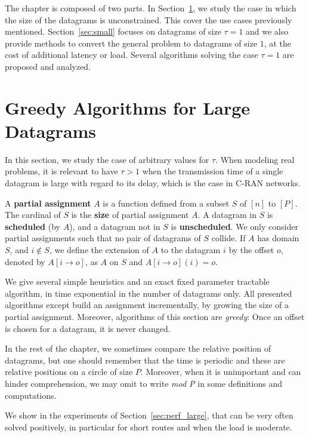 The chapter is composed of two parts. In Section~\ref{sec:large}, we study the case in which the size of the datagrams is unconstrained. This cover the use cases previously mentioned. Section~\ref{sec:small} focuses on datagrams of size $\tau = 1$ and we also provide methods to convert the general problem to datagrams of size $1$, at the cost of additional latency or load. Several algorithms solving the case $\tau = 1$ are proposed and analyzed.

\section{Greedy Algorithms for Large Datagrams} \label{sec:large}

In this section, we study the case of arbitrary values for $\tau$. When modeling real problems,
it is relevant to have $\tau > 1$ when the transmission time of a single datagram is large with regard to its delay,
which is the case in C-RAN networks.

A \textbf{partial assignment} $A$ is a function defined from a subset $S$ of $[n]$ to $[P]$.
The cardinal of $S$ is the \textbf{size} of partial assignment $A$. A datagram in $S$ is \textbf{scheduled} (by $A$), and a datagram not in $S$ is \textbf{unscheduled}. We only consider partial assignments such that no pair of datagrams of $S$ collide. If $A$ has domain $S$, and $i \notin S$, we define the extension of $A$ to the datagram $i$ by the offset $o$, denoted by $A[i \rightarrow o]$, as $A$ on $S$ and $A[i \rightarrow o](i) = o$.

  We give several simple heuristics and an exact fixed parameter tractable algorithm, in time exponential in the number of datagrams only. All presented algorithms except \exactresolution build an assignment incrementally, by growing the size of a partial assignment. Moreover, algorithms of this section are \emph{greedy}: Once an offset is chosen for a datagram, it is never changed. 

In the rest of the chapter, we sometimes compare the relative position of datagrams, but one should remember that the
time is periodic and these are relative positions on a circle of size $P$. Moreover, when it is unimportant and can hinder comprehension, we may omit to write \emph{mod P} in some definitions and computations.

We show in the experiments of Section~\ref{sec:perf_large}, that \pma can be very often solved positively, in particular for short routes and when the load is moderate.



